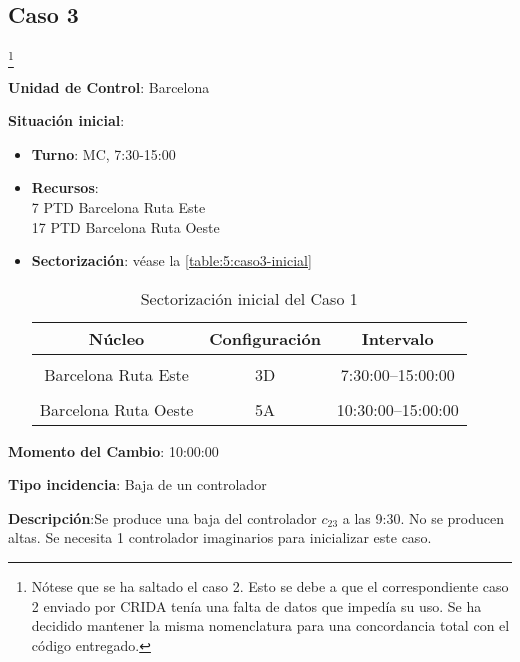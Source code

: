 \subsection{Caso 3}\footnote{Nótese que se ha saltado el caso 2. Esto se debe a que el correspondiente caso 2 enviado por \gls{CRIDA} tenía una falta de datos que impedía su uso. Se ha decidido mantener la misma nomenclatura para una concordancia total con el código entregado.}

\textbf{Unidad de Control}: Barcelona

\textbf{Situación inicial}:
\begin{itemize}[label={}]
	
	\item \textbf{Turno}: MC, 7:30-15:00
	
	\item \textbf{Recursos}: \\
	7 PTD Barcelona Ruta Este \\
	17 PTD Barcelona Ruta Oeste
	
	
	\item \textbf{Sectorización}: véase la \autoref{table:5:caso3-inicial}
	\begin{table}[h]
		\centering
		\caption{Sectorización inicial del Caso 1}
		\begin{tabular}{ccc}
			\hline
			\textbf{Núcleo}      & \textbf{Configuración} & \textbf{Intervalo}   \\ \hline
			\multicolumn{1}{l}{} & \multicolumn{1}{l}{}   & \multicolumn{1}{l}{} \\
			Barcelona Ruta Este  & 3D                     & 7:30:00--15:00:00    \\
			\multicolumn{1}{l}{} & \multicolumn{1}{l}{}   & \multicolumn{1}{l}{} \\
			Barcelona Ruta Oeste & 5A                     & 10:30:00--15:00:00   \\ \hline
		\end{tabular}
		\label{table:5:caso3-inicial}
	\end{table}
	
	
\end{itemize}

\textbf{Momento del Cambio}: 10:00:00

\textbf{Tipo incidencia}: Baja de un controlador

\textbf{Descripción}:Se produce una baja del controlador $c_{23}$ a las 9:30. No se producen altas. Se necesita 1 controlador imaginarios para inicializar este caso.

